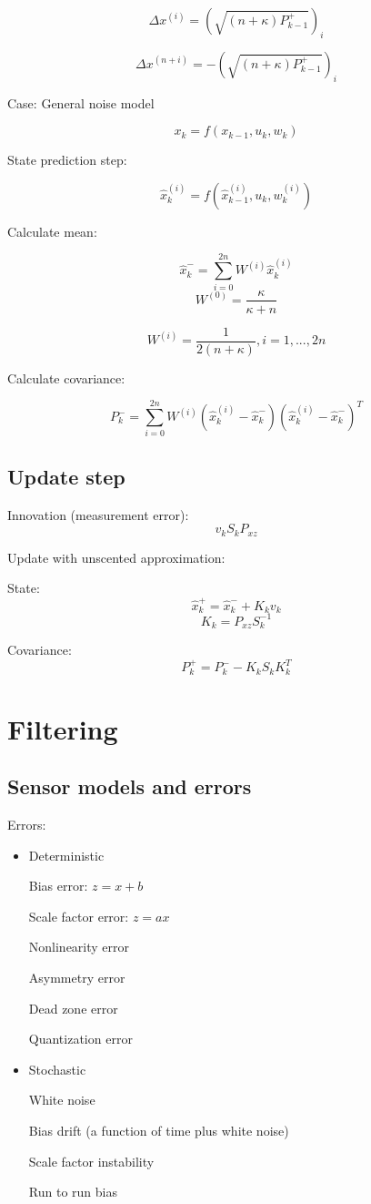 \documentclass[11pt]{article}
\begin{document}
\[ \Delta x^{(i)} = (\sqrt{(n + \kappa) P^+_{k-1}})_i \]

\[ \Delta x^{(n+i)} = -(\sqrt{(n + \kappa) P^+_{k-1}})_i \]

Case: General noise model


\[ x_k = f(x_{k-1}, u_k, w_k) \]

State prediction step:

\[ \hat{x}^{(i)}_k =  f(\hat{x}^{(i)}_{k-1}, u_k, w_k^{(i)}) \]

Calculate mean:


\[ \hat{x}^-_k = \sum_{i=0}^{2n} W^{(i)} \hat{x}^{(i)}_k \]
\[ W^{(0)} = \frac{\kappa}{\kappa + n} \]

\[W^{(i)} = \frac{1}{2(n + \kappa)}, i = 1, ..., 2n \]

Calculate covariance:


\[ P_k^- = \sum_{i=0}^{2n} W^{(i)} (\hat{x}^{(i)}_k  - \hat{x}^-_k ) (\hat{x}^{(i)}_k  - \hat{x}^-_k )^T \] 



\subsection{Update step}

Innovation (measurement error): 
\[ v_k S_k P_{xz} \]

Update with unscented approximation: 

State:
\[ \hat{x}^+_k = \hat{x}^-_k + K_k v_k \] 
\[K_k = P_{xz} S_k^{-1} \]

Covariance: \[ P_k^+ = P_k^- - K_k S_k K_k^T \]


\section{Filtering}

\subsection{Sensor models and errors}

Errors:
\begin{itemize}
    \item Deterministic 

    Bias error: $z = x + b$

    Scale factor error: $z = ax$

    Nonlinearity error 

    Asymmetry error

    Dead zone error 

    Quantization error 

    \item Stochastic 
    
    White noise

    Bias drift (a function of time plus white noise)

    Scale factor instability 

    Run to run bias 



\end{itemize}
\end{document}
